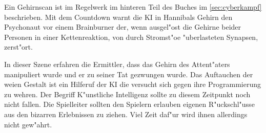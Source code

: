 \begin{remarks}
	Ein Gehirnscan ist im Regelwerk im hinteren Teil des Buches im \cref{sec:cyberkampf} beschrieben. Mit dem Countdown warnt die KI in Hannibals Gehirn den Psychonaut vor einem Brainburner der, wenn ausgel"ost die Gehirne beider Personen in einer Kettenreaktion, von durch Stromst"o\3e "uberlasteten Synapsen, zerst"ort.

	In dieser Szene erfahren die Ermittler, dass das Gehirn des Attent"aters manipuliert wurde und er zu seiner Tat gezwungen wurde. Das Auftauchen der wei\3en Gestalt ist ein Hilferuf der KI die versucht sich gegen ihre Programmierung zu wehren. Der Begriff K"unstliche Intelligenz sollte zu diesem Zeitpunkt noch nicht fallen. Die Spielleiter sollten den Spielern erlauben eigenen R"uckschl"usse aus den bizarren Erlebnissen zu ziehen. Viel Zeit daf"ur wird ihnen allerdings nicht gew"ahrt.
\end{remarks}
